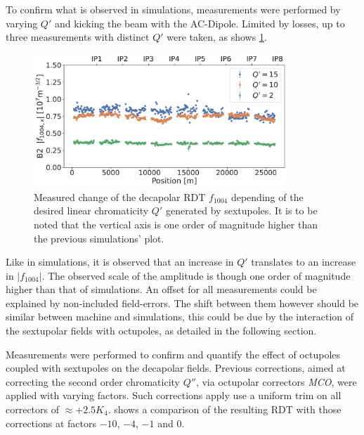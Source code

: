 To confirm what is observed in simulations, measurements were performed by varying $Q'$ and kicking
the beam with the AC-Dipole. Limited by losses, up to three measurements with distinct $Q'$ were
taken, as shows \cref{fig:decapoles:rdts:measured_f1004_from_sextupoles}.

\begin{figure}[!htb]
    \centering
    \includegraphics[width=0.85\textwidth]{./images/f1004/f1004x_q2_q10_q15.pdf}
    \caption{Measured change of the decapolar RDT $f_{1004}$ depending of the desired linear
    chromaticity $Q'$ generated by sextupoles. It is to be noted that the vertical axis is one
    order of magnitude higher than the previous simulations' plot.
    }
    \label{fig:decapoles:rdts:measured_f1004_from_sextupoles}
\end{figure}

Like in simulations, it is observed that an increase in $Q'$ translates to an increase in 
$|f_{1004}|$. The observed scale of the amplitude is though one order of magnitude higher than that
of simulations. An offset for all measurements could be explained by non-included field-errors. The
shift between them however should be similar between machine and simulations, this could be due by
the interaction of the sextupolar fields with octupoles, as detailed in the following section. 


Measurements were performed to confirm and quantify the effect of octupoles coupled with sextupoles
on the decapolar fields. Previous corrections, aimed at correcting the second order chromaticity
$Q''$, via octupolar correctors \textit{MCO}, were applied with varying factors. Such corrections
apply use a uniform trim on all correctors of $\approx +2.5K_4$.
 shows a comparison of the resulting RDT with those
corrections at factors $-10$, $-4$, $-1$ and $0$.

